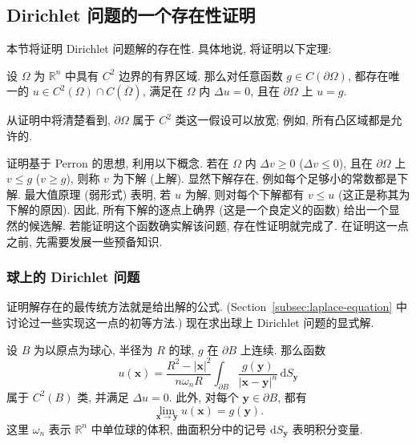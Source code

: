 \subsection{Dirichlet 问题的一个存在性证明}\label{sec:dirichlet-existence-proof}

本节将证明 Dirichlet 问题解的存在性. 具体地说, 将证明以下定理:

\begin{Theorem}
\label{thm:dirichlet-continuous-data-existence}
设 $\Omega$ 为 $\mathbb{R}^n$ 中具有 $C^2$ 边界的有界区域. 那么对任意函数 $g\in C(\partial\Omega)$, 都存在唯一的 $u\in C^2(\Omega)\cap C(\overline\Omega)$, 满足在 $\Omega$ 内 $\Delta u=0$, 且在 $\partial\Omega$ 上 $u=g$.
\end{Theorem}

从证明中将清楚看到, $\partial\Omega$ 属于 $C^2$ 类这一假设可以放宽; 例如, 所有凸区域都是允许的.

证明基于 Perron 的思想, 利用以下概念. 若在 $\Omega$ 内 $\Delta v\geq0$ ($\Delta v\leq0$), 且在 $\partial\Omega$ 上 $v\leq g$ ($v\geq g$), 则称 $v$ 为下解 (上解). 显然下解存在, 例如每个足够小的常数都是下解. 最大值原理 (弱形式) 表明, 若 $u$ 为解, 则对每个下解都有 $v\leq u$ (这正是称其为下解的原因). 因此, 所有下解的逐点上确界 (这是一个良定义的函数) 给出一个显然的候选解. 若能证明这个函数确实解该问题, 存在性证明就完成了. 在证明这一点之前, 先需要发展一些预备知识.

\subsubsection{球上的 Dirichlet 问题}\label{subsec:dirichlet-problem-on-ball}

证明解存在的最传统方法就是给出解的公式. (Section~\ref{subsec:laplace-equation} 中讨论过一些实现这一点的初等方法.) 现在求出球上 Dirichlet 问题的显式解.

\begin{Theorem}
\label{thm:poisson-ball-formula}
设 $B$ 为以原点为球心, 半径为 $R$ 的球, $g$ 在 $\partial B$ 上连续. 那么函数
\begin{equation}\label{eq:poisson-ball-solution-formula}
u(\bm{x})=\dfrac{R^2-|\bm{x}|^2}{n\omega_nR}\int_{\partial B}\dfrac{g(\bm{y})}{|\bm{x}-\bm{y}|^n}\,\mathrm{d}S_{\bm{y}}
\end{equation}
属于 $C^2(B)$ 类, 并满足 $\Delta u=0$. 此外, 对每个 $\bm{y}\in\partial B$, 都有
\begin{equation}\label{eq:poisson-ball-boundary-limit}
\lim_{\bm{x}\to\bm{y}}u(\bm{x})=g(\bm{y}).
\end{equation}
这里 $\omega_n$ 表示 $\mathbb{R}^n$ 中单位球的体积, 曲面积分中的记号 $\mathrm{d}S_{\bm{y}}$ 表明积分变量.
\end{Theorem}


